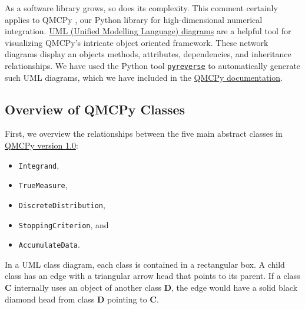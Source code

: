 As a software library grows, so does its complexity. This comment certainly applies to QMCPy \cite{QMCPy2020a}, our Python library for high-dimensional numerical integration. \href{https://en.wikipedia.org/wiki/Unified\_Modeling\_Language}{UML (Unified Modelling Language) diagrams} are a helpful tool for visualizing QMCPy's intricate object oriented framework. These network diagrams display an objects methods, attributes, dependencies, and inheritance relationships. We have used the Python tool \href{https://pypi.org/project/pyreverse/}{\texttt{pyreverse}} to automatically generate such UML diagrams, which we have included in the \href{https://qmcpy.readthedocs.io/en/latest/algorithms.html}{QMCPy documentation}. 

\subsection{Overview of QMCPy Classes}

First, we overview the relationships between the five main abstract classes in \href{https://qmcpy.org/2021/02/12/qmcpy-version-1-0/}{QMCPy version 1.0}:  
\begin{itemize}
    \item \texttt{Integrand},
    \item \texttt{TrueMeasure},
    \item \texttt{DiscreteDistribution},
    \item \texttt{StoppingCriterion}, and 
    \item \texttt{AccumulateData}. 
\end{itemize}

In a UML class diagram, each class is contained in a rectangular box. A child class has an edge with a triangular arrow head that points to its parent.  If a class \textbf{C} internally uses an object of another class \textbf{D}, the edge would have a solid black diamond head from class \textbf{D} pointing to \textbf{C}.  


